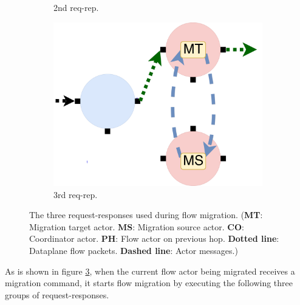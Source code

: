 \begin{figure}[!h]
\begin{subfigure}[t]{0.33\linewidth}
     \caption{2nd req-rep.}\label{fig:mig2}
    \end{subfigure}\hfill
  \begin{subfigure}[t]{0.33\linewidth}
 \centering
   \includegraphics[width=\columnwidth]{figure/nfactor-mig3.pdf}
   \caption{3rd req-rep.}\label{fig:mig3} \end{subfigure}\hfill
 \caption{The three request-responses used during flow migration. (\textbf{MT}: Migration target actor. \textbf{MS}: Migration source actor. \textbf{CO}: Coordinator actor. \textbf{PH}: Flow actor on previous hop. \textbf{Dotted line}: Dataplane flow packets. \textbf{Dashed line}: Actor messages.)}
\label{fig:mig}
\end{figure}

As is shown in figure \ref{fig:mig}, when the current flow actor being migrated receives a migration command, it starts flow migration by executing the following three groups of request-responses.

